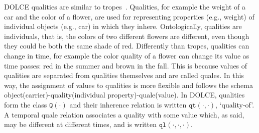\documentclass[sw]{iosart2x}
\newcommand{\generalStyle}[1]{\texttt{#1}}
\newcommand{\biRel}[3]{\generalStyle{#1}(#2,#3)}
\newcommand{\uniRel}[2]{\generalStyle{#1}(#2)}
\newcommand{\triRel}[4]{\generalStyle{#1}(#2,#3,#4)}
\newcommand{\DOLCE}{\textsc{DOLCE}\xspace} %
\newcommand{\DOLCEQuality}[1]{\uniRel{Q}{#1}}
\newcommand{\DOLCEQualityDirect}[2]{\biRel{qt}{#1}{#2}}
\newcommand{\DOLCEQualeDirectTer}[3]{\triRel{{ql}}{#1}{#2}{#3}}
\newcommand{\quotes}[1]{`#1'}
\begin{document}
\DOLCE qualities are similar to tropes~\cite{Campbell90}. Qualities, for example the weight of a car and the color of a flower, are used for representing properties (e.g., weight) of individual objects (e.g., car) in which they inhere.
Ontologically, qualities are individuals, that is, the colors of two different flowers are different, even though they could be both the same shade of red.
Differently than tropes, qualities can change in time, for example the color quality of a flower can change its value as time passes: red in the summer and brown in the fall.
This is because values of qualities are separated from qualities themselves and are called quales. 
In this way, the assignment of values to qualities is more flexible and follows the schema object(carrier)-quality(individual property)-quale(value).
In \DOLCE, qualities form the class $\DOLCEQuality{\cdot}$ and their inherence relation is written $\DOLCEQualityDirect{\cdot}{\cdot}$, \quotes{quality-of}. A temporal quale relation associates a quality with some value which, as said, may be different at different times, and is written $\DOLCEQualeDirectTer{\cdot}{\cdot}{\cdot}$.%
\end{document}
